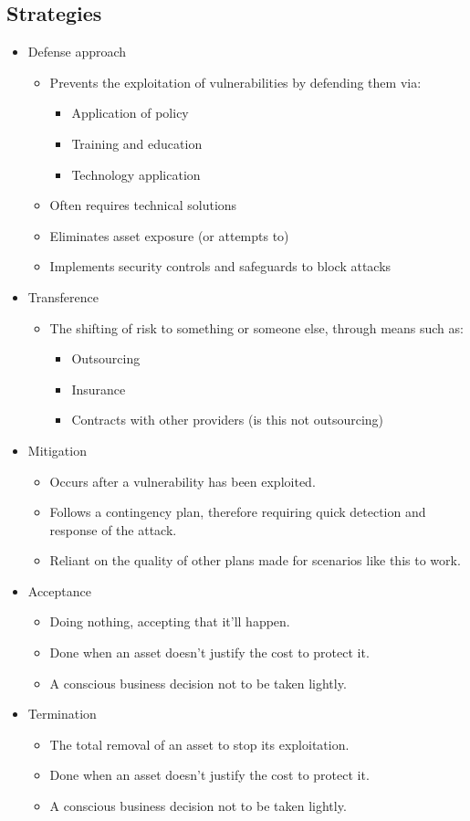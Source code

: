 \documentclass[12pt]{report}
\begin{document}
\subsection{Strategies}
\begin{itemize}
	\item Defense approach
	\begin{itemize}
		\item Prevents the exploitation of vulnerabilities by defending them via:
		\begin{itemize}
			\item Application of policy
			\item Training and education
			\item Technology application
		\end{itemize}
		\item Often requires technical solutions
		\item Eliminates asset exposure (or attempts to)
		\item Implements security controls and safeguards to block attacks
	\end{itemize}
	\item Transference
	\begin{itemize}
		\item The shifting of risk to something or someone else, through means such as:
		\begin{itemize}
			\item Outsourcing
			\item Insurance
			\item Contracts with other providers (is this not outsourcing)
		\end{itemize}
	\end{itemize}
	\item Mitigation
	\begin{itemize}
		\item Occurs after a vulnerability has been exploited.
		\item Follows a contingency plan, therefore requiring quick detection and response of the attack.
		\item Reliant on the quality of other plans made for scenarios like this to work.
	\end{itemize}
	\item Acceptance
	\begin{itemize}
		\item Doing nothing, accepting that it'll happen.
		\item Done when an asset doesn't justify the cost to protect it.
		\item A conscious business decision not to be taken lightly.
	\end{itemize}
	\item Termination
	\begin{itemize}
		\item The total removal of an asset to stop its exploitation.
		\item Done when an asset doesn't justify the cost to protect it.
		\item A conscious business decision not to be taken lightly.
	\end{itemize}
\end{itemize}
\end{document}

